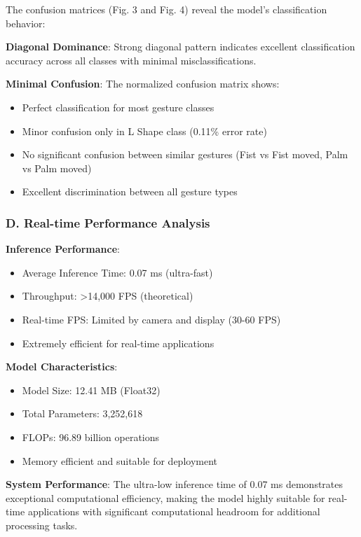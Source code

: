 \documentclass[11pt,a4paper,twoside]{article}
\providecommand{\tightlist}{%
  \setlength{\itemsep}{0pt}\setlength{\parskip}{0pt}}
\begin{document}
The confusion matrices (Fig. 3 and Fig. 4) reveal the model's
classification behavior:

\textbf{Diagonal Dominance}: Strong diagonal pattern indicates excellent
classification accuracy across all classes with minimal
misclassifications.

\textbf{Minimal Confusion}: The normalized confusion matrix shows:

\begin{itemize}
\tightlist
\item
  Perfect classification for most gesture classes
\item
  Minor confusion only in L Shape class (0.11\% error rate)
\item
  No significant confusion between similar gestures (Fist vs Fist moved,
  Palm vs Palm moved)
\item
  Excellent discrimination between all gesture types
\end{itemize}

\subsubsection{D. Real-time Performance
Analysis}

\textbf{Inference Performance}:

\begin{itemize}
\tightlist
\item
  Average Inference Time: 0.07 ms (ultra-fast)
\item
  Throughput: \textgreater14,000 FPS (theoretical)
\item
  Real-time FPS: Limited by camera and display (30-60 FPS)
\item
  Extremely efficient for real-time applications
\end{itemize}

\textbf{Model Characteristics}:

\begin{itemize}
\tightlist
\item
  Model Size: 12.41 MB (Float32)
\item
  Total Parameters: 3,252,618
\item
  FLOPs: 96.89 billion operations
\item
  Memory efficient and suitable for deployment
\end{itemize}

\textbf{System Performance}: The ultra-low inference time of 0.07 ms
demonstrates exceptional computational efficiency, making the model
highly suitable for real-time applications with significant
computational headroom for additional processing tasks.
\end{document}
